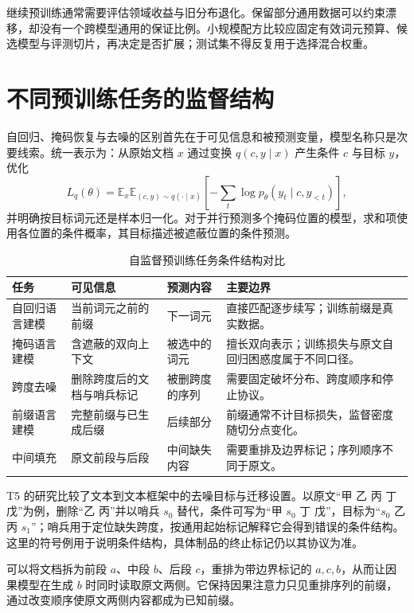 \documentclass[../textbook.tex]{subfiles}
\begin{document}
继续预训练通常需要评估领域收益与旧分布退化。保留部分通用数据可以约束漂移，却没有一个跨模型通用的保证比例。小规模配方比较应固定有效词元预算、候选模型与评测切片，再决定是否扩展；测试集不得反复用于选择混合权重。

\section{不同预训练任务的监督结构}

自回归、掩码恢复与去噪的区别首先在于可见信息和被预测变量，模型名称只是次要线索。统一表示为：从原始文档 $x$ 通过变换 $q(c,y\mid x)$ 产生条件 $c$ 与目标 $y$，优化
\begin{equation}
 L_q(\theta)=\mathbb E_{x}\mathbb E_{(c,y)\sim q(\cdot\mid x)}
 \left[-\sum_t\log p_\theta(y_t\mid c,y_{<t})\right],
 \label{eq:pt-corruption}
\end{equation}
并明确按目标词元还是样本归一化。对于并行预测多个掩码位置的模型，求和项使用各位置的条件概率，其目标描述被遮蔽位置的条件预测。

\begin{table}[htbp]
\centering
\caption{自监督预训练任务条件结构对比}
\label{tab:pretraining-tasks}
\begin{tabularx}{\linewidth}{lXXX}
\toprule 任务 & 可见信息 & 预测内容 & 主要边界\\\midrule
自回归语言建模 & 当前词元之前的前缀 & 下一词元 & 直接匹配逐步续写；训练前缀是真实数据。\\
掩码语言建模 & 含遮蔽的双向上下文 & 被选中的词元 & 擅长双向表示；训练损失与原文自回归困惑度属于不同口径。\\
跨度去噪 & 删除跨度后的文档与哨兵标记 & 被删跨度的序列 & 需要固定破坏分布、跨度顺序和停止协议。\\
前缀语言建模 & 完整前缀与已生成后缀 & 后续部分 & 前缀通常不计目标损失，监督密度随切分点变化。\\
中间填充 & 原文前段与后段 & 中间缺失内容 & 需要重排及边界标记；序列顺序不同于原文。\\
\bottomrule
\end{tabularx}
\end{table}

T5 的研究比较了文本到文本框架中的去噪目标与迁移设置\cite{raffel2020t5}。以原文“甲 乙 丙 丁 戊”为例，删除“乙 丙”并以哨兵 $s_0$ 替代，条件可写为“甲 $s_0$ 丁 戊”，目标为“$s_0$ 乙 丙 $s_1$”；哨兵用于定位缺失跨度，按通用起始标记解释它会得到错误的条件结构。这里的符号例用于说明条件结构，具体制品的终止标记仍以其协议为准。

可以将文档拆为前段 $a$、中段 $b$、后段 $c$，重排为带边界标记的 $a,c,b$，从而让因果模型在生成 $b$ 时同时读取原文两侧\cite{bavarian2022fim}。它保持因果注意力只见重排序列的前缀，通过改变顺序使原文两侧内容都成为已知前缀。
\end{document}
